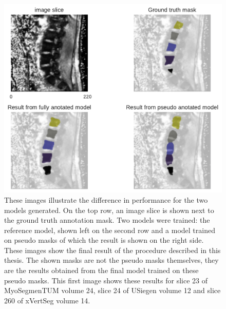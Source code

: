 \begin{figure}
    \centering
        \includegraphics[width=.99\textwidth]{images/fullvsPseudo_MyoSegmenTUM_024_023.pdf}
    \caption{These images illustrate the difference in performance for the two models generated. On the top row, an image slice is shown next to the ground truth annotation mask.
    Two models were trained: the reference model, shown left on the second row and a model trained on pseudo masks of which the result is shown on the right side. 
    These images show the final result of the procedure described in this thesis. The shown masks are not the pseudo masks themselves, they are the results obtained from the final model trained on these pseudo masks.
    This first image shows these results for slice 23 of MyoSegmenTUM volume 24, slice 24 of USiegen volume 12 and slice 260 of xVertSeg volume 14. 
    \protect
    \label{fig:fullvsPseudo}}
\end{figure}
